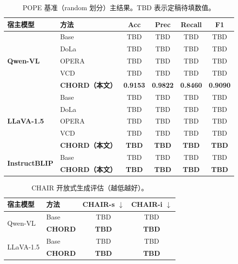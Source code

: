 \begin{table}[t]
  \centering
  \caption{POPE 基准（random 划分）主结果。TBD 表示定稿待填数值。}
  \label{tab:pope}
  \small
  \begin{tabular}{llcccc}
    \toprule
    宿主模型 & 方法 & Acc & Prec & Recall & F1 \\
    \midrule
    \multirow{5}{*}{\textbf{Qwen-VL}}
      & Base & TBD & TBD & TBD & TBD \\
      & DoLa & TBD & TBD & TBD & TBD \\
      & OPERA & TBD & TBD & TBD & TBD \\
      & VCD & TBD & TBD & TBD & TBD \\
      & \textbf{CHORD（本文）} & \textbf{0.9153} & \textbf{0.9822} & \textbf{0.8460} & \textbf{0.9090} \\
    \midrule
    \multirow{5}{*}{\textbf{LLaVA-1.5}}
      & Base & TBD & TBD & TBD & TBD \\
      & DoLa & TBD & TBD & TBD & TBD \\
      & OPERA & TBD & TBD & TBD & TBD \\
      & VCD & TBD & TBD & TBD & TBD \\
      & \textbf{CHORD（本文）} & \textbf{TBD} & \textbf{TBD} & \textbf{TBD} & \textbf{TBD} \\
    \midrule
    \multirow{2}{*}{\textbf{InstructBLIP}}
      & Base & TBD & TBD & TBD & TBD \\
      & \textbf{CHORD（本文）} & \textbf{TBD} & \textbf{TBD} & \textbf{TBD} & \textbf{TBD} \\
    \bottomrule
  \end{tabular}
\end{table}

\begin{table}[t]
  \centering
  \caption{CHAIR 开放式生成评估（越低越好）。}
  \label{tab:chair}
  \small
  \begin{tabular}{llcc}
    \toprule
    宿主模型 & 方法 & CHAIR-s $\downarrow$ & CHAIR-i $\downarrow$ \\
    \midrule
    \multirow{2}{*}{Qwen-VL} & Base & TBD & TBD \\
      & \textbf{CHORD} & \textbf{TBD} & \textbf{TBD} \\
    \multirow{2}{*}{LLaVA-1.5} & Base & TBD & TBD \\
      & \textbf{CHORD} & \textbf{TBD} & \textbf{TBD} \\
    \bottomrule
  \end{tabular}
\end{table}

